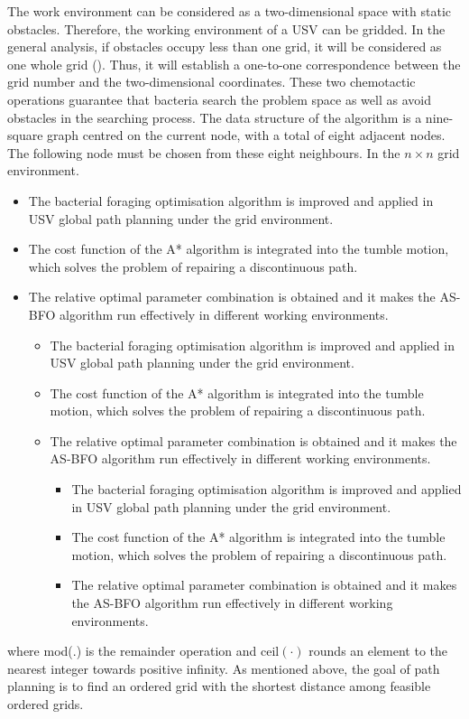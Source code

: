 \documentclass{PDS}%
\theoremstyle{definition}
\begin{document}
The work environment can be considered
as a two-dimensional space with static obstacles. Therefore, the working environment of a
USV can be gridded. In the general analysis, if obstacles occupy less than one grid, it
will be considered as one whole grid (\citealp{r33}). Thus, it will establish a
one-to-one correspondence between the grid number and the
two-dimensional coordinates. These two chemotactic operations
guarantee that bacteria search the problem space as well as avoid obstacles in the
searching process. The data structure of the algorithm is a nine-square graph centred on the current node,
with a total of eight adjacent nodes. The following node must be chosen from these eight
neighbours. In the $n\times n$ grid environment.
\begin{itemize}
\item The bacterial foraging optimisation algorithm is improved and applied in USV
global path planning under the grid environment.

\item The cost function of the A* algorithm is integrated into the tumble motion, which
solves the problem of repairing a discontinuous path.

\item The relative optimal parameter combination is obtained and it makes the AS-BFO algorithm
run effectively in different working environments.
\begin{itemize}
\item The bacterial foraging optimisation algorithm is improved and applied in USV
global path planning under the grid environment.

\item The cost function of the A* algorithm is integrated into the tumble motion, which
solves the problem of repairing a discontinuous path.

\item The relative optimal parameter combination is obtained and it makes the AS-BFO algorithm
run effectively in different working environments.
\begin{itemize}
\item The bacterial foraging optimisation algorithm is improved and applied in USV
global path planning under the grid environment.

\item The cost function of the A* algorithm is integrated into the tumble motion, which
solves the problem of repairing a discontinuous path.

\item The relative optimal parameter combination is obtained and it makes the AS-BFO algorithm
run effectively in different working environments.
\end{itemize}

\end{itemize}

\end{itemize}
where mod(.) is the remainder operation and $\text{ceil}(\cdot)$ rounds an element to
the nearest integer towards positive infinity. As mentioned above, the goal of path
planning is to find an ordered grid with the shortest distance among feasible ordered
grids.
\end{document}
